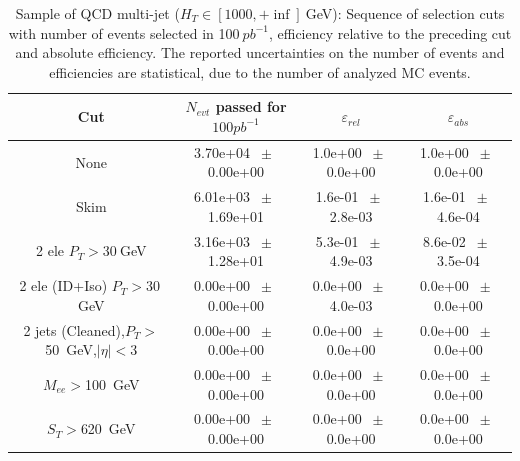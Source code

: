 \begin{table}[htbp] 
\begin{center} 
\begin{tabular}{|c|c|c|c|} 
\hline\hline 
 Cut & $N_{evt}$ passed for $100pb^{-1}$ & $\varepsilon_{rel}$ & $\varepsilon_{abs}$ \\ 
\hline\hline 
None       &        3.70e+04       $~\pm~$       0.00e+00        &        1.0e+00       $~\pm~$       0.0e+00        &        1.0e+00       $~\pm~$       0.0e+00       \\       
       Skim       &        6.01e+03       $~\pm~$       1.69e+01        &        1.6e-01       $~\pm~$       2.8e-03        &        1.6e-01       $~\pm~$       4.6e-04       \\       
       2 ele $P_T>30~$GeV       &        3.16e+03       $~\pm~$       1.28e+01        &        5.3e-01       $~\pm~$       4.9e-03        &        8.6e-02       $~\pm~$       3.5e-04       \\       
       2 ele (ID+Iso) $P_T>30~$GeV       &        0.00e+00       $~\pm~$       0.00e+00        &        0.0e+00       $~\pm~$       4.0e-03        &        0.0e+00       $~\pm~$       0.0e+00       \\       
       2 jets (Cleaned),$P_T>$50~GeV,$|\eta|<$3       &        0.00e+00       $~\pm~$       0.00e+00        &        0.0e+00       $~\pm~$       0.0e+00        &        0.0e+00       $~\pm~$       0.0e+00       \\       
       $M_{ee}>$100~GeV       &        0.00e+00       $~\pm~$       0.00e+00        &        0.0e+00       $~\pm~$       0.0e+00        &        0.0e+00       $~\pm~$       0.0e+00       \\       
       $S_T>$620~GeV       &        0.00e+00       $~\pm~$       0.00e+00        &        0.0e+00       $~\pm~$       0.0e+00        &        0.0e+00       $~\pm~$       0.0e+00       \\       
       \hline\hline 
\end{tabular} 
\end{center} 
\caption{Sample of QCD multi-jet ($H_T \in [1000,+\inf]~$GeV): Sequence of selection cuts with number of events selected in 100$~pb^{-1}$, efficiency relative to the preceding cut and absolute efficiency. The reported uncertainties on the number of events and efficiencies are statistical, due to the number of analyzed MC events.} 
\label{tab:effic-QCD-1000-inf} 
\end{table} 

